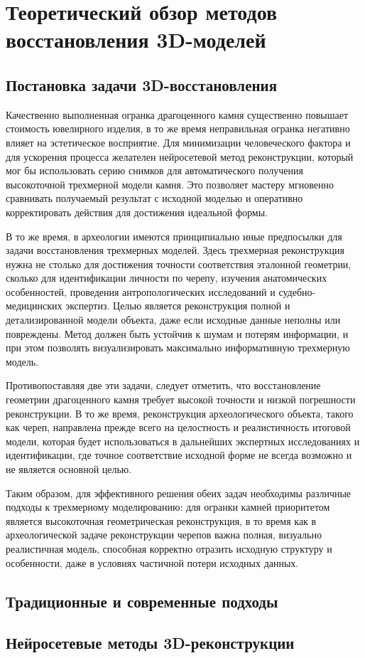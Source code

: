 \chapter{Теоретический обзор методов восстановления 3D-моделей}

\section{Постановка задачи 3D-восстановления}

Качественно выполненная огранка драгоценного камня существенно повышает
стоимость ювелирного изделия, в то же время неправильная огранка негативно
влияет на эстетическое восприятие. Для минимизации человеческого
фактора и для ускорения процесса желателен нейросетевой метод реконструкции,
который мог бы использовать серию снимков для автоматического получения
высокоточной трехмерной модели камня. Это позволяет мастеру мгновенно сравнивать
получаемый результат с исходной моделью и оперативно корректировать действия для
достижения идеальной формы.

В то же время, в археологии имеются принципиально иные предпосылки для задачи
восстановления трехмерных моделей. Здесь трехмерная реконструкция нужна не
столько для достижения точности соответствия эталонной геометрии, сколько для
идентификации личности по черепу, изучения анатомических особенностей,
проведения антропологических исследований и судебно-медицинских экспертиз. Целью
является реконструкция полной и детализированной модели объекта, даже если
исходные данные неполны или повреждены. Метод должен быть устойчив к шумам и
потерям информации, и при этом позволять визуализировать максимально
информативную трехмерную модель.

Противопоставляя две эти задачи, следует отметить, что восстановление геометрии
драгоценного камня требует высокой точности и низкой погрешности реконструкции. В то же
время, реконструкция археологического объекта, такого как череп, направлена
прежде всего на целостность и реалистичность итоговой модели, которая будет
использоваться в дальнейших экспертных исследованиях и идентификации, где точное
соответствие исходной форме не всегда возможно и не является основной целью.

Таким образом, для эффективного решения обеих задач необходимы различные подходы
к трехмерному моделированию: для огранки камней приоритетом является
высокоточная геометрическая реконструкция, в то время как в археологической
задаче реконструкции черепов важна полная, визуально реалистичная модель,
способная корректно отразить исходную структуру и особенности, даже в условиях
частичной потери исходных данных.

\section{Традиционные и современные подходы}
\section{Нейросетевые методы 3D-реконструкции}

